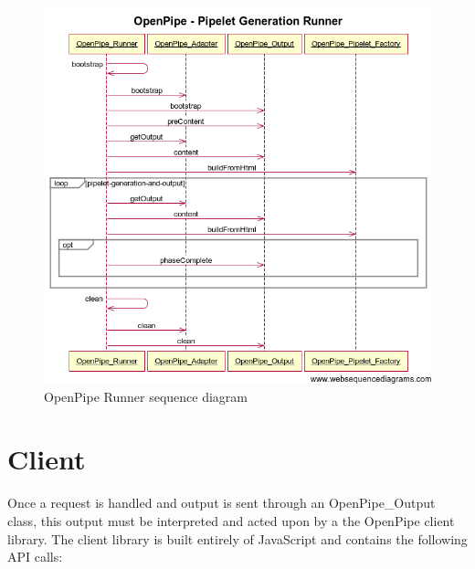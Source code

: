 \documentclass[12pt]{report}
\begin{document}
\begin{figure}[H]
\caption{OpenPipe Runner sequence diagram}
\label{fig:openPipeRunnerSequenceDiagram}
\centering
\includegraphics[width=\textwidth,keepaspectratio]{figures/images/openpipe_runner.png}
\end{figure}

\section{Client}

Once a request is handled and output is sent through an OpenPipe\_Output class, this output must be interpreted and acted upon by a the OpenPipe client library.  The client library is built entirely of JavaScript and contains the following API calls:
\end{document}
